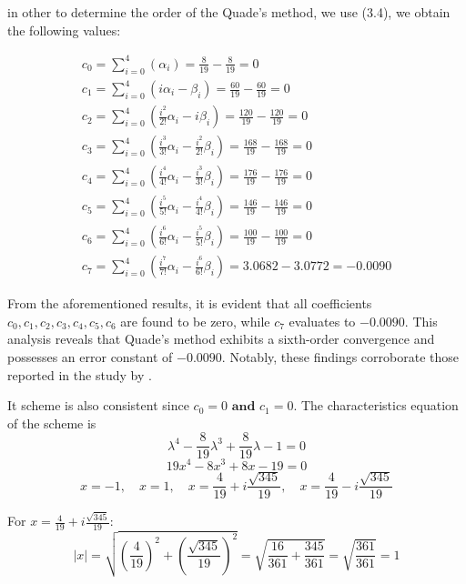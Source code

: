 \documentclass[a4paper, twoside]{report} %
\begin{document}
	in other to determine the order of the Quade's method, we use (3.4), we obtain the following values:


	\begin{eqnarray}
		c_0 = \sum_{i=0}^{4}(\alpha_i) = \frac{8}{19} - \frac{8}{19} = 0 \\
		c_1 = \sum_{i=0}^{4}(i\alpha_i - \beta_i) = \frac{60}{19} - \frac{60}{19} = 0 \\
		c_2 = \sum_{i=0}^{4}(\frac{i^2}{2!} \alpha_i - i \beta_i) = \frac{120}{19} - \frac{120}{19} = 0 \\
		c_3 = \sum_{i=0}^{4}(\frac{i^3}{3!} \alpha_i - \frac{i^2}{2!} \beta_i) = \frac{168}{19} - \frac{168}{19} = 0 \\
		c_4 = \sum_{i=0}^{4}(\frac{i^4}{4!} \alpha_i - \frac{i^3}{3!} \beta_i) = \frac{176}{19} - \frac{176}{19} = 0 \\
		c_5 = \sum_{i=0}^{4}(\frac{i^5}{5!} \alpha_i - \frac{i^4}{4!} \beta_i) = \frac{146}{19} - \frac{146}{19} = 0 \\
		c_6 = \sum_{i=0}^{4}(\frac{i^6}{6!} \alpha_i - \frac{i^5}{5!} \beta_i) = \frac{100}{19} - \frac{100}{19} = 0 \\
		c_7 = \sum_{i=0}^{4}(\frac{i^7}{7!} \alpha_i - \frac{i^6}{6!} \beta_i) = 3.0682 - 3.0772 = -0.0090
	\end{eqnarray}

	From the aforementioned results, it is evident that all coefficients \(c_0, c_1, c_2, c_3, c_4, c_5, c_6\) are found to be zero, while \(c_7\) evaluates to \(-0.0090\). This analysis reveals that Quade's method exhibits a sixth-order convergence and possesses an error constant of \(-0.0090\). Notably, these findings corroborate those reported in the study by \cite{Fadugba2018}.


	It scheme is also consistent since \(c_0 = 0 \textbf{ and } c_1 = 0\).
	The characteristics equation of the scheme is
	\begin{equation}
		\lambda^4 - \frac{8}{19}\lambda^3 + \frac{8}{19}\lambda - 1  = 0
	\end{equation}
	\begin{equation}
		19x^4 - 8x^3 + 8x - 19 = 0
	\end{equation}
	\begin{equation}
		x = -1, \quad x = 1, \quad x = \frac{4}{19} + i\frac{\sqrt{345}}{19}, \quad x = \frac{4}{19} - i\frac{\sqrt{345}}{19}
	\end{equation}

	For \( x = \frac{4}{19} + i\frac{\sqrt{345}}{19} \):
	\[
	|x| = \sqrt{\left(\frac{4}{19}\right)^2 + \left(\frac{\sqrt{345}}{19}\right)^2} = \sqrt{\frac{16}{361} + \frac{345}{361}} = \sqrt{\frac{361}{361}} = 1
	\]
\end{document}
